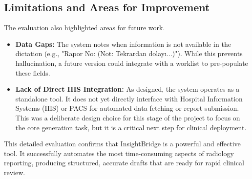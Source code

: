 \subsection{Limitations and Areas for Improvement}
The evaluation also highlighted areas for future work.
\begin{itemize}
    \item \textbf{Data Gaps:} The system notes when information is not available in the dictation (e.g., "Rapor No: (Not: Tekrardan dolayı...)"). While this prevents hallucination, a future version could integrate with a worklist to pre-populate these fields.
    \item \textbf{Lack of Direct HIS Integration:} As designed, the system operates as a standalone tool. It does not yet directly interface with Hospital Information Systems (HIS) or PACS for automated data fetching or report submission. This was a deliberate design choice for this stage of the project to focus on the core generation task, but it is a critical next step for clinical deployment.
\end{itemize}

This detailed evaluation confirms that InsightBridge is a powerful and effective tool. It successfully automates the most time-consuming aspects of radiology reporting, producing structured, accurate drafts that are ready for rapid clinical review. 